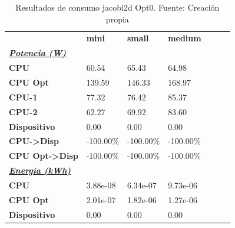\begin{table}[H]
    \centering
    \begin{tabular}{lllllll}
    \rowcolor[HTML]{DAE8FC} \ & \textbf{mini} & \textbf{	small} & \textbf{	medium} \\
    \cellcolor[HTML]{DAE8FC} \textbf{\textbf{{\emph{{\underline{{Potencia (W)}}}}}}} &  & 	 & 	 \\
    \rowcolor[HTML]{EFEFEF} \cellcolor[HTML]{DAE8FC} \textbf{CPU} & 60.54 & 	65.43 & 	64.98 \\
    \cellcolor[HTML]{DAE8FC} \textbf{CPU Opt} & 139.59 & 	146.33 & 	168.97 \\
    \rowcolor[HTML]{EFEFEF} \cellcolor[HTML]{DAE8FC} \textbf{\quad CPU-1} & 77.32 & 	76.42 & 	85.37 \\
    \cellcolor[HTML]{DAE8FC} \textbf{\quad CPU-2} & 62.27 & 	69.92 & 	83.60 \\
    \rowcolor[HTML]{EFEFEF} \cellcolor[HTML]{DAE8FC} \textbf{Dispositivo} & 0.00 & 	0.00 & 	0.00 \\
    \cellcolor[HTML]{DAE8FC} \textbf{CPU->Disp} & -100.00\% & 	-100.00\% & 	-100.00\% \\
    \rowcolor[HTML]{EFEFEF} \cellcolor[HTML]{DAE8FC} \textbf{CPU Opt->Disp} & -100.00\% & 	-100.00\% & 	-100.00\% \\
    \cellcolor[HTML]{DAE8FC} \textbf{\textbf{{\emph{{\underline{{Energía (kWh)}}}}}}} &  & 	 & 	 \\
    \rowcolor[HTML]{EFEFEF} \cellcolor[HTML]{DAE8FC} \textbf{CPU} & 3.88e-08 & 	6.34e-07 & 	9.73e-06 \\
    \cellcolor[HTML]{DAE8FC} \textbf{CPU Opt} & 2.01e-07 & 	1.82e-06 & 	1.27e-06 \\
    \rowcolor[HTML]{EFEFEF} \cellcolor[HTML]{DAE8FC} \textbf{Dispositivo} & 0.00 & 	0.00 & 	0.00 \\
    \end{tabular}
    \caption[Resultados de consumo jacobi2d Opt0]{{Resultados de consumo jacobi2d Opt0. Fuente: Creación propia}}
    \label{table_test_jacobi2d_Opt0_hw_powerResults}
\end{table}
